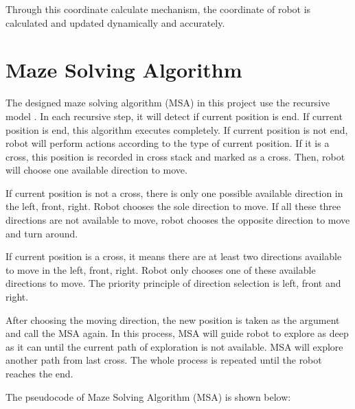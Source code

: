 \documentclass[11pt,times,oneside,openright,hardcopy]{eeereport}
\begin{document}
Through this coordinate calculate mechanism, the coordinate of robot is calculated and updated dynamically and accurately.



\section{Maze Solving Algorithm}
The designed maze solving algorithm (MSA) in this project use the recursive model \cite{Khoussainov:1995vx}. In each recursive step, it will detect if current position is end.
If current position is end, this algorithm executes completely. If current position is not end, robot will perform actions according to the type of current position.
If it is a cross, this position is recorded in cross stack and marked as a cross. Then, robot will choose one available direction to move. 

If current position is not a cross, there is only one possible available direction in the left, front, right. 
Robot chooses the sole direction to move. If all these three directions are not available to move, robot chooses the opposite direction to move and turn around.

If current position is a cross, it means there are at least two directions available to move in the left, front, right. 
Robot only chooses one of these available directions to move. The priority principle of direction selection is left, front and right.

After choosing the moving direction, the new position is taken as the argument and call the MSA again. 
In this process, MSA will guide robot to explore as deep as it can until the current path of exploration is not available. MSA will explore another path from last cross. 
The whole process is repeated until the robot reaches the end. 

The pseudocode of Maze Solving Algorithm (MSA) is shown below:
\end{document}

